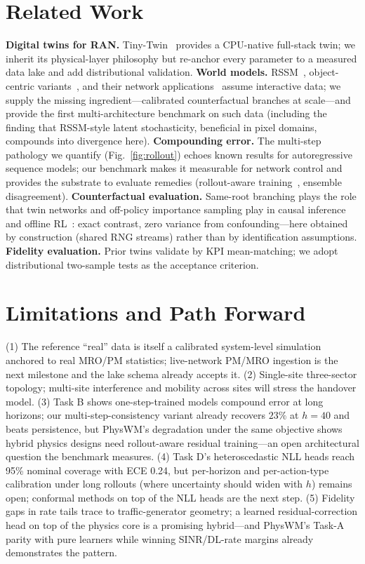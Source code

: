 \documentclass[10pt,conference]{IEEEtran}
\begin{document}
\section{Related Work}
\textbf{Digital twins for RAN.} Tiny-Twin~\cite{tinytwin} provides a CPU-native full-stack twin; we inherit its physical-layer philosophy but re-anchor every parameter to a measured data lake and add distributional validation.
\textbf{World models.} RSSM~\cite{hafner2019dream}, object-centric variants~\cite{objwm}, and their network applications~\cite{uavwm} assume interactive data; we supply the missing ingredient---calibrated counterfactual branches at scale---and provide the first multi-architecture benchmark on such data (including the finding that RSSM-style latent stochasticity, beneficial in pixel domains, compounds into divergence here).
\textbf{Compounding error.} The multi-step pathology we quantify (Fig.~\ref{fig:rollout}) echoes known results for autoregressive sequence models; our benchmark makes it measurable for network control and provides the substrate to evaluate remedies (rollout-aware training~\cite{jtd}, ensemble disagreement).
\textbf{Counterfactual evaluation.} Same-root branching plays the role that twin networks and off-policy importance sampling play in causal inference and offline RL~\cite{levine2020offline}: exact contrast, zero variance from confounding---here obtained by construction (shared RNG streams) rather than by identification assumptions.
\textbf{Fidelity evaluation.} Prior twins validate by KPI mean-matching; we adopt distributional two-sample tests as the acceptance criterion.

\section{Limitations and Path Forward}
(1) The reference ``real'' data is itself a calibrated system-level simulation anchored to real MRO/PM statistics; live-network PM/MRO ingestion is the next milestone and the lake schema already accepts it.
(2) Single-site three-sector topology; multi-site interference and mobility across sites will stress the handover model.
(3) Task B shows one-step-trained models compound error at long horizons; our multi-step-consistency variant already recovers $23\%$ at $h{=}40$ and beats persistence, but PhysWM's degradation under the same objective shows hybrid physics designs need rollout-aware residual training---an open architectural question the benchmark measures.
(4) Task D's heteroscedastic NLL heads reach 95\% nominal coverage with ECE 0.24, but per-horizon and per-action-type calibration under long rollouts (where uncertainty should widen with $h$) remains open; conformal methods on top of the NLL heads are the next step.
(5) Fidelity gaps in rate tails trace to traffic-generator geometry; a learned residual-correction head on top of the physics core is a promising hybrid---and PhysWM's Task-A parity with pure learners while winning SINR/DL-rate margins already demonstrates the pattern.
\end{document}
